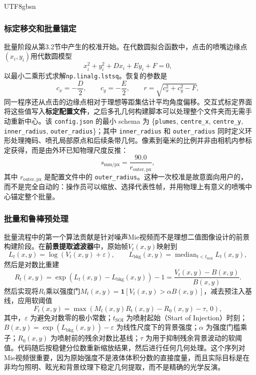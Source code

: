 \documentclass[english, 12pt, a4paper, elec, utf8, a-2b, online]{aaltothesis}
\begin{document}
\begin{CJK*}{UTF8}{gbsn}
\subsubsection{标定移交和批量锚定}

批量阶段从第3.2节中产生的校准开始。在代数圆拟合函数中，点击的喷嘴边缘点\((x_i,y_i)\)用代数圆模型
\[
x_i^2+y_i^2 + D x_i + E y_i + F = 0,
\]
以最小二乘形式求解\texttt{np.linalg.lstsq}。恢复的参数是
\[
c_x=-\frac{D}{2}, \qquad c_y=-\frac{E}{2}, \qquad r=\sqrt{c_x^2+c_y^2-F},
\]
同一程序还从点击的边缘点相对于理想等距集估计平均角度偏移。交互式标定界面将这些值写入\textbf{标定配置文件}，之后多孔几何构建脚本可以处理整个文件夹而无需手动重新中心。该 \texttt{config.json} 的最小 schema 为 \{\texttt{plumes}, \texttt{centre\_x}, \texttt{centre\_y}, \texttt{inner\_radius}, \texttt{outer\_radius}\}；其中 \texttt{inner\_radius} 和 \texttt{outer\_radius} 同时定义环形处理掩码、喷孔局部原点和后续条带几何。像素到毫米的比例并非由相机内参标定获得，而是由外环已知物理尺度反推：
\[
s_{\mathrm{mm/px}}=\frac{90.0}{r_{\mathrm{outer,px}}},
\]
其中 \(r_{\mathrm{outer,px}}\) 是配置文件中的 \texttt{outer\_radius}。这种一次校准是故意面向用户的，而不是完全自动的：操作员可以缩放、选择代表性帧，并用物理上有意义的喷嘴中心锚定整个批量\cite{Pratt1987CircleFit,Taubin1991CircleFit}。

\subsubsection{批量和鲁棒预处理}

批量流程中的第一个算法贡献是针对噪声\textnormal{Mie}视频而不是理想二值图像设计的前景构建阶段。在\textbf{前景提取滤波器}中，原始帧\(V_t(x,y)\)映射到
\[
L_t(x,y)=\log(V_t(x,y)+\varepsilon),
\qquad
L_{\mathrm{bkg}}(x,y)=\operatorname{median}_{t<t_{\mathrm{SOI}}} L_t(x,y),
\]
然后是对数比重建
\[
R_t(x,y)=\exp\!\left(L_t(x,y)-L_{\mathrm{bkg}}(x,y)\right)-1
=\frac{V_t(x,y)-B(x,y)}{B(x,y)}.
\]
然后实现将\(R_t\)乘以强度门\(M_t(x,y)=\mathbf{1}[V_t(x,y)>\alpha B(x,y)]\)，减去预注入基线，应用软阈值
\[
F_t(x,y)=\max\!\left(M_t(x,y)R_t(x,y)-R_0(x,y)-\tau,\,0\right),
\]
其中，\(\varepsilon\) 为避免对数零的极小常数；\(t_{\mathrm{SOI}}\) 为喷射起始（Start of Injection）时刻；\(B(x,y) = \exp(L_{\mathrm{bkg}}(x,y)) - \varepsilon\) 为线性尺度下的背景强度；\(\alpha\) 为强度门槛乘子；\(R_0(x,y)\) 为喷射前的残余对数比基线；\(\tau\) 为用于抑制残余背景波动的软阈值。代码随后按稳健分位数重新缩放结果，然后进行任何几何处理。这个序列对Mie视频很重要，因为原始强度不是液体体积分数的直接度量，而且实际目标是在非均匀照明、眩光和背景纹理下稳定几何提取，而不是精确的光学反演\cite{BohrenHuffman2004,Linne2013SprayImaging,GonzalezWoodsDIP}。


\end{CJK*}
\end{document}
